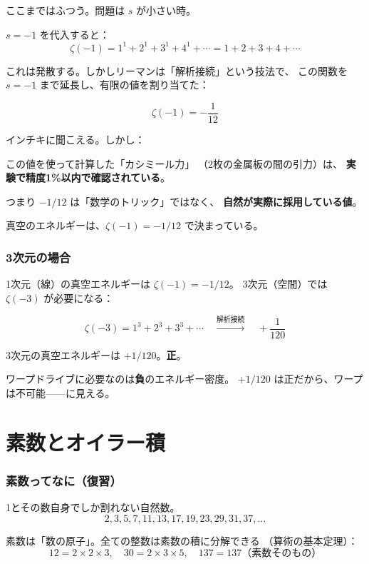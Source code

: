 \documentclass[12pt,a4paper]{article}
\begin{document}
ここまではふつう。問題は $s$ が小さい時。

$s = -1$ を代入すると：
$$\zeta(-1) = 1^1 + 2^1 + 3^1 + 4^1 + \cdots = 1 + 2 + 3 + 4 + \cdots$$

これは発散する。しかしリーマンは「解析接続」という技法で、
この関数を $s = -1$ まで延長し、有限の値を割り当てた：

$$\zeta(-1) = -\frac{1}{12}$$

\begin{storybox}[え、$1+2+3+\cdots = -1/12$?]
インチキに聞こえる。しかし：

この値を使って計算した「カシミール力」
（2枚の金属板の間の引力）は、
\textbf{実験で精度1\%以内で確認されている}。

つまり $-1/12$ は「数学のトリック」ではなく、
\textbf{自然が実際に採用している値}。

真空のエネルギーは、$\zeta(-1) = -1/12$ で決まっている。
\end{storybox}

\section{3次元の場合}

1次元（線）の真空エネルギーは $\zeta(-1) = -1/12$。
3次元（空間）では $\zeta(-3)$ が必要になる：

$$\zeta(-3) = 1^3 + 2^3 + 3^3 + \cdots \quad \xrightarrow{\text{解析接続}} \quad +\frac{1}{120}$$

3次元の真空エネルギーは $+1/120$。\textbf{正}。

ワープドライブに必要なのは\textbf{負}のエネルギー密度。
$+1/120$ は正だから、ワープは不可能——に見える。

\part{素数とオイラー積}

\section{素数ってなに（復習）}

\begin{mathbox}[素数]
1とその数自身でしか割れない自然数。
$$2, 3, 5, 7, 11, 13, 17, 19, 23, 29, 31, 37, \ldots$$

素数は「数の原子」。全ての整数は素数の積に分解できる
（算術の基本定理）：
$$12 = 2 \times 2 \times 3, \quad 30 = 2 \times 3 \times 5, \quad 137 = 137 \text{（素数そのもの）}$$
\end{mathbox}
\end{document}

